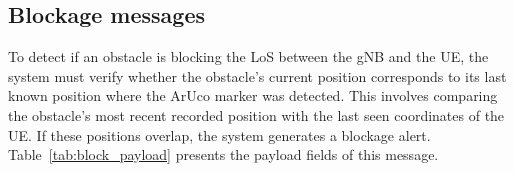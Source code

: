 \begin{table}[H]
    \caption{Components of the Prior to Blockage message's payload}
    \label{tab:future_block_message}
    \centering
\end{table}




\subsection{Blockage messages}\label{subsec:blocking-messages}
To detect if an obstacle is blocking the LoS between the gNB and the UE, the system must verify whether the obstacle’s current position corresponds to its last known position where the ArUco marker was detected.
This involves comparing the obstacle's most recent recorded position with the last seen coordinates of the UE\@.
If these positions overlap, the system generates a blockage alert.
Table~\ref{tab:block_payload} presents the payload fields of this message.


